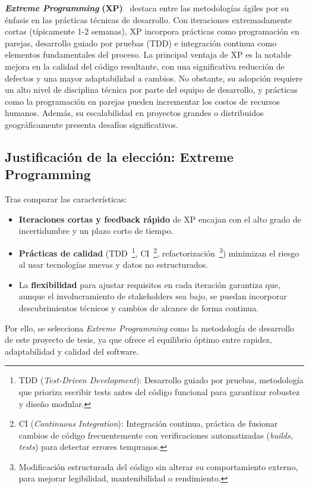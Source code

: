 \textit{\textbf{Extreme Programming}} \textbf{(XP)}~\cite{beck2000extreme} destaca entre las metodologías ágiles por su énfasis en las prácticas técnicas de desarrollo. Con iteraciones extremadamente cortas (típicamente 1-2 semanas), XP incorpora prácticas como programación en parejas, desarrollo guiado por pruebas (TDD) e integración continua como elementos fundamentales del proceso. La principal ventaja de XP es la notable mejora en la calidad del código resultante, con una significativa reducción de defectos y una mayor adaptabilidad a cambios. No obstante, su adopción requiere un alto nivel de disciplina técnica por parte del equipo de desarrollo, y prácticas como la programación en parejas pueden incrementar los costos de recursos humanos. Además, su escalabilidad en proyectos grandes o distribuidos geográficamente presenta desafíos significativos.

\subsection{Justificación de la elección: Extreme Programming}
Tras comparar las características:

\begin{itemize}
	\item \textbf{Iteraciones cortas y feedback rápido} de XP encajan con el alto grado de incertidumbre y un plazo corto de tiempo.  
	\item \textbf{Prácticas de calidad} (TDD~\footnote{TDD (\textit{Test-Driven Development}): Desarrollo guiado por pruebas, metodología que prioriza escribir tests antes del código funcional para garantizar robustez y diseño modular.}, CI~\footnote{CI (\textit{Continuous Integration}): Integración continua, práctica de fusionar cambios de código frecuentemente con verificaciones automatizadas (\textit{builds, tests}) para detectar errores tempranos.}, refactorización~\footnote{Modificación estructurada del código sin alterar su comportamiento externo, para mejorar legibilidad, mantenibilidad o rendimiento.}) minimizan el riesgo al usar tecnologías nuevas y datos no estructurados.   
	\item La \textbf{flexibilidad} para ajustar requisitos en cada iteración garantiza que, aunque el involucramiento de stakeholders sea bajo, se puedan incorporar descubrimientos técnicos y cambios de alcance de forma continua.
\end{itemize}

Por ello, se selecciona \textit{Extreme Programming} como la metodología de desarrollo de este proyecto de tesis, ya que ofrece el equilibrio óptimo entre rapidez, adaptabilidad y calidad del software.~\cite{agilealliance_xp}  


